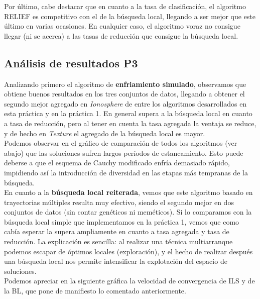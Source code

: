 \documentclass[12pt]{article}
\begin{document}
Por último, cabe destacar que en cuanto a la tasa de clasificación, el algoritmo RELIEF es competitivo con el de la búsqueda local, llegando a ser mejor que este último en varias ocasiones. En cualquier caso, el algoritmo voraz no consigue llegar (ni se acerca) a las tasas de reducción que consigue la búsqueda local.

\subsection*{Análisis de resultados P3}
\label{analisis}

Analizando primero el algoritmo de \textbf{enfriamiento simulado}, observamos que obtiene buenos resultados en los tres conjuntos de datos, llegando a obtener el segundo mejor agregado en \textit{Ionosphere} de entre los algoritmos desarrollados en esta práctica y en la práctica 1. En general supera a la búsqueda local en cuanto a tasa de reducción, pero al tener en cuenta la tasa agregada la ventaja se reduce, y de hecho en \textit{Texture} el agregado de la búsqueda local es mayor.\\

Podemos observar en el gráfico de comparación de todos los algoritmos (ver abajo) que las soluciones sufren largos períodos de estancamiento. Esto puede deberse a que el esquema de Cauchy modificado enfría demasiado rápido, impidiendo así la introducción de diversidad en las etapas más tempranas de la búsqueda.\\

En cuanto a la \textbf{búsqueda local reiterada}, vemos que este algoritmo basado en trayectorias múltiples resulta muy efectivo, siendo el segundo mejor en dos conjuntos de datos (sin contar genéticos ni meméticos). Si lo comparamos con la búsqueda local simple que implementamos en la práctica 1, vemos que como cabía esperar la supera ampliamente en cuanto a tasa agregada y tasa de reducción. La explicación es sencilla: al realizar una técnica multiarranque podemos escapar de óptimos locales (exploración), y el hecho de realizar después una búsqueda local nos permite intensificar la explotación del espacio de soluciones.\\

Podemos apreciar en la siguiente gráfica la velocidad de convergencia de ILS y de la BL, que pone de manifiesto lo comentado anteriormente.\\
\end{document}
